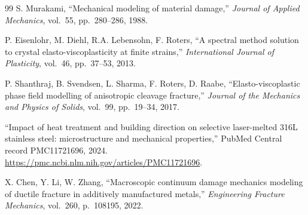 \documentclass[twocolumn]{sagej}
\begin{document}
\begin{thebibliography}{99}
S. Murakami, ``Mechanical modeling of material damage,'' \textit{Journal of Applied Mechanics}, vol.~55, pp.~280--286, 1988.

P. Eisenlohr, M. Diehl, R.A. Lebensohn, F. Roters, ``A spectral method solution to crystal elasto-viscoplasticity at finite strains,'' \textit{International Journal of Plasticity}, vol.~46, pp.~37--53, 2013.

P. Shanthraj, B. Svendsen, L. Sharma, F. Roters, D. Raabe, ``Elasto-viscoplastic phase field modelling of anisotropic cleavage fracture,'' \textit{Journal of the Mechanics and Physics of Solids}, vol.~99, pp.~19--34, 2017.

``Impact of heat treatment and building direction on selective laser-melted 316L stainless steel: microstructure and mechanical properties,'' PubMed Central record PMC11721696, 2024. \url{https://pmc.ncbi.nlm.nih.gov/articles/PMC11721696}.

X. Chen, Y. Li, W. Zhang, ``Macroscopic continuum damage mechanics modeling of ductile fracture in additively manufactured metals,'' \textit{Engineering Fracture Mechanics}, vol.~260, p.~108195, 2022.
\end{thebibliography}
\end{document}
